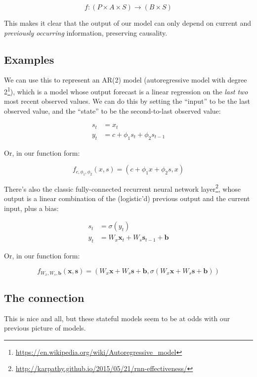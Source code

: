 \documentclass[]{article}
\renewcommand{\href}[2]{#2\footnote{\url{#1}}}
\begin{document}
\[
f : (P \times A \times S) \rightarrow (B \times S)
\]

This makes it clear that the output of our model can only depend on current and
\emph{previously occurring} information, preserving causality.

\subsection{Examples}\label{examples}

We can use this to represent an AR(2) model
(\href{https://en.wikipedia.org/wiki/Autoregressive_model}{autoregressive model
with degree 2}), which is a model whose output forecast is a linear regression
on the \emph{last two} most recent observed values. We can do this by setting
the ``input'' to be the last observed value, and the ``state'' to be the
second-to-last observed value:

\[
\begin{aligned}
s_t & = x_t \\
y_t & = c + \phi_1 s_t + \phi_2 s_{t - 1}
\end{aligned}
\]

Or, in our function form:

\[
f_{c, \phi_1, \phi_2}(x, s) = (c + \phi_1 x + \phi_2 s, x)
\]

There's also the classic
\href{http://karpathy.github.io/2015/05/21/rnn-effectiveness/}{fully-connected
recurrent neural network layer}, whose output is a linear combination of the
(logistic'd) previous output and the current input, plus a bias:

\[
\begin{aligned}
s_t & = \sigma(y_t) \\
y_t & = W_x \mathbf{x}_t + W_s \mathbf{s}_{t-1} + \mathbf{b}
\end{aligned}
\]

Or, in our function form:

\[
f_{W_x, W_s, \mathbf{b}}(\mathbf{x}, \mathbf{s}) =
  ( W_x \mathbf{x} + W_s \mathbf{s} + \mathbf{b}
  , \sigma(W_x \mathbf{x} + W_s \mathbf{s} + \mathbf{b})
  )
\]

\subsection{The connection}\label{the-connection}

This is nice and all, but these stateful models seem to be at odds with our
previous picture of models.
\end{document}
